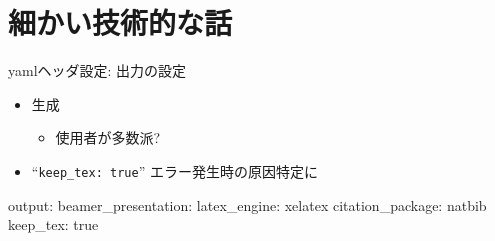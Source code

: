 \documentclass[14pt,ignorenonframetext,]{beamer}
\newenvironment{Shaded}{\begin{snugshade}}{\end{snugshade}}
\newcommand{\AttributeTok}[1]{\textcolor[rgb]{0.77,0.63,0.00}{#1}}
\newcommand{\FunctionTok}[1]{\textcolor[rgb]{0.00,0.00,0.00}{#1}}
\providecommand{\tightlist}{%
  \setlength{\itemsep}{0pt}\setlength{\parskip}{0pt}}
\begin{document}
\hypertarget{ux7d30ux304bux3044ux6280ux8853ux7684ux306aux8a71}{%
\section{細かい技術的な話}\label{ux7d30ux304bux3044ux6280ux8853ux7684ux306aux8a71}}

\begin{frame}[fragile]{yamlヘッダ設定: 出力の設定}
\protect\hypertarget{yamlux30d8ux30c3ux30c0ux8a2dux5b9a-ux51faux529bux306eux8a2dux5b9a}{}

\begin{itemize}
\tightlist
\item
  \XeLaTeX 生成

  \begin{itemize}
  \tightlist
  \item
    \LuaLaTeX 使用者が多数派?
  \end{itemize}
\item
  ``\texttt{keep\_tex:\ true}'' エラー発生時の原因特定に
\end{itemize}

\begin{Shaded}
\begin{Highlighting}[]
\FunctionTok{output:}
  \FunctionTok{beamer_presentation:}
    \FunctionTok{latex_engine:}\AttributeTok{ xelatex}
    \FunctionTok{citation_package:}\AttributeTok{ natbib}
    \FunctionTok{keep_tex:}\AttributeTok{ true}
\end{Highlighting}
\end{Shaded}

\end{frame}
\end{document}
